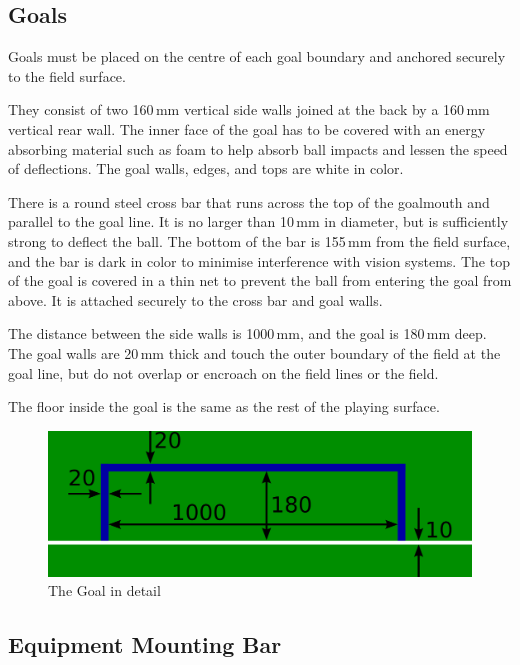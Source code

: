 \subsection{Goals}
Goals must be placed on the centre of each goal boundary and anchored
securely to the field surface.

They consist of two 160\,mm vertical side walls joined at the back by a 160\,mm
vertical rear wall. The inner face of the goal has to be covered with an energy
absorbing material such as foam to help absorb ball impacts and lessen the speed
of deflections.
The goal walls, edges, and tops are white in color.

There is a round steel cross bar that runs across the top of the goalmouth and
parallel to the goal line. It is no larger than 10\,mm in diameter, but is
sufficiently strong to deflect the ball. The bottom of the bar is 155\,mm from
the field surface, and the bar is dark in color to minimise interference with
vision systems. The top of the goal is covered in a thin net to prevent the ball
from entering the goal from above. It is attached securely to the cross bar and
goal walls.

The distance between the side walls is 1000\,mm, and the goal is 180\,mm deep.
The goal walls are 20\,mm thick and touch the outer boundary of the field at
the goal line, but do not overlap or encroach on the field lines or the field.

The floor inside the goal is the same as the rest of the playing surface.

\begin{figure}[ht] %
  \centering
  \includegraphics[width=0.5\columnwidth]{img/goal_detail.png}
  \caption{The Goal in detail}
  \label{fig:sslgoal}
\end{figure}

\subsection{Equipment Mounting Bar}


